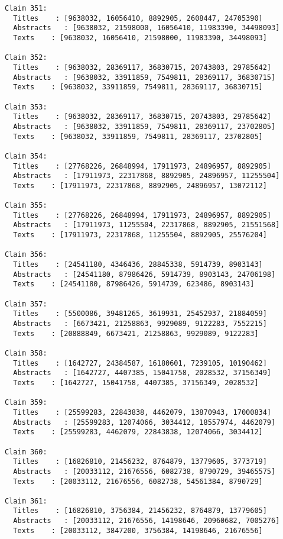 \documentclass[11pt]{article}
\begin{document}
\begin{Verbatim}[commandchars=\\\{\}]
Claim 351:
  Titles    : [9638032, 16056410, 8892905, 2608447, 24705390]
  Abstracts   : [9638032, 21598000, 16056410, 11983390, 34498093]
  Texts    : [9638032, 16056410, 21598000, 11983390, 34498093]

Claim 352:
  Titles    : [9638032, 28369117, 36830715, 20743803, 29785642]
  Abstracts   : [9638032, 33911859, 7549811, 28369117, 36830715]
  Texts    : [9638032, 33911859, 7549811, 28369117, 36830715]

Claim 353:
  Titles    : [9638032, 28369117, 36830715, 20743803, 29785642]
  Abstracts   : [9638032, 33911859, 7549811, 28369117, 23702805]
  Texts    : [9638032, 33911859, 7549811, 28369117, 23702805]

Claim 354:
  Titles    : [27768226, 26848994, 17911973, 24896957, 8892905]
  Abstracts   : [17911973, 22317868, 8892905, 24896957, 11255504]
  Texts    : [17911973, 22317868, 8892905, 24896957, 13072112]

Claim 355:
  Titles    : [27768226, 26848994, 17911973, 24896957, 8892905]
  Abstracts   : [17911973, 11255504, 22317868, 8892905, 21551568]
  Texts    : [17911973, 22317868, 11255504, 8892905, 25576204]

Claim 356:
  Titles    : [24541180, 4346436, 28845338, 5914739, 8903143]
  Abstracts   : [24541180, 87986426, 5914739, 8903143, 24706198]
  Texts    : [24541180, 87986426, 5914739, 623486, 8903143]

Claim 357:
  Titles    : [5500086, 39481265, 3619931, 25452937, 21884059]
  Abstracts   : [6673421, 21258863, 9929089, 9122283, 7552215]
  Texts    : [20888849, 6673421, 21258863, 9929089, 9122283]

Claim 358:
  Titles    : [1642727, 24384587, 16180601, 7239105, 10190462]
  Abstracts   : [1642727, 4407385, 15041758, 2028532, 37156349]
  Texts    : [1642727, 15041758, 4407385, 37156349, 2028532]

Claim 359:
  Titles    : [25599283, 22843838, 4462079, 13870943, 17000834]
  Abstracts   : [25599283, 12074066, 3034412, 18557974, 4462079]
  Texts    : [25599283, 4462079, 22843838, 12074066, 3034412]

Claim 360:
  Titles    : [16826810, 21456232, 8764879, 13779605, 3773719]
  Abstracts   : [20033112, 21676556, 6082738, 8790729, 39465575]
  Texts    : [20033112, 21676556, 6082738, 54561384, 8790729]

Claim 361:
  Titles    : [16826810, 3756384, 21456232, 8764879, 13779605]
  Abstracts   : [20033112, 21676556, 14198646, 20960682, 7005276]
  Texts    : [20033112, 3847200, 3756384, 14198646, 21676556]


\end{Verbatim}
\end{document}
